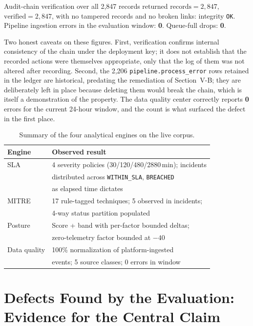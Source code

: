 \documentclass[conference]{IEEEtran}
\begin{document}
Audit-chain verification over all 2{,}847 records returned
$\text{records}{=}2{,}847$, $\text{verified}{=}2{,}847$, with no tampered
records and no broken links: integrity \texttt{OK}. Pipeline ingestion errors
in the evaluation window: \textbf{0}. Queue-full drops: \textbf{0}.

Two honest caveats on these figures. First, verification confirms internal
consistency of the chain under the deployment key; it does not establish that
the recorded actions were themselves appropriate, only that the log of them
was not altered after recording. Second, the 2{,}206 \texttt{pipeline.process\_error}
rows retained in the ledger are historical, predating the remediation of
Section~V-B; they are deliberately left in place because deleting them would
break the chain, which is itself a demonstration of the property. The
data quality center correctly reports \textbf{0} errors for the current
24-hour window, and the count is what surfaced the defect in the first place.

\begin{table}[t]
\caption{Summary of the four analytical engines on the live corpus.}
\label{tab:engines}
\centering
\footnotesize
\begin{tabular}{@{}ll@{}}
\toprule
\textbf{Engine} & \textbf{Observed result} \\
\midrule
SLA & 4 severity policies (30/120/480/2880\,min); incidents \\
 & distributed across \texttt{WITHIN\_SLA}, \texttt{BREACHED} \\
 & as elapsed time dictates \\
MITRE & 17 rule-tagged techniques; 5 observed in incidents; \\
 & 4-way status partition populated \\
Posture & Score + band with per-factor bounded deltas; \\
 & zero-telemetry factor bounded at $-40$ \\
Data quality & 100\% normalization of platform-ingested \\
 & events; 5 source classes; 0 errors in window \\
\bottomrule
\end{tabular}
\end{table}

\section{Defects Found by the Evaluation: Evidence for the Central Claim}
\end{document}
